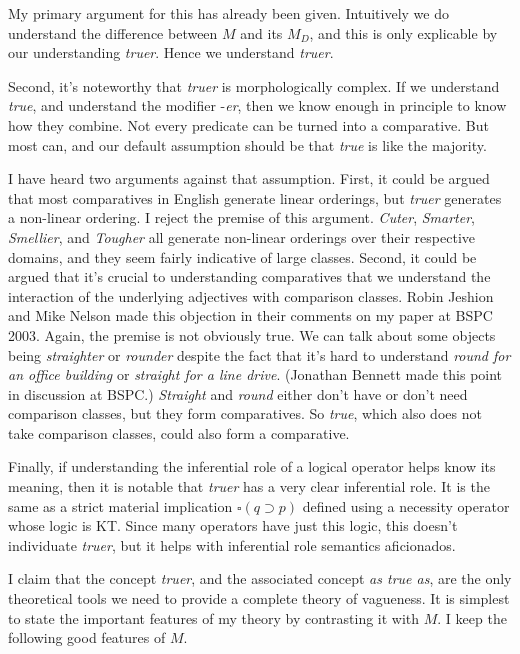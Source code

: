 My primary argument for this has already been given. Intuitively we do understand the difference between \(M\) and its \(M_D\), and this is only explicable by our understanding \textit{truer}. Hence we understand \textit{truer}.

Second, it's noteworthy that \textit{truer} is morphologically complex. If we understand \textit{true}, and understand the modifier -\textit{er}, then we know enough in principle to know how they combine. Not every predicate can be turned into a comparative. But most can, and our default assumption should be that \textit{true} is like the majority.

I have heard two arguments against that assumption. First, it could be argued that most comparatives in English generate linear orderings, but \textit{truer} generates a non-linear ordering. I reject the premise of this argument. \textit{Cuter}, \textit{Smarter}, \textit{Smellier}, and \textit{Tougher} all generate non-linear orderings over their respective domains, and they seem fairly indicative of large classes. Second, it could be argued that it's crucial to understanding comparatives that we understand the interaction of the underlying adjectives with comparison classes. Robin Jeshion and Mike Nelson made this objection in their comments on my paper at BSPC 2003. Again, the premise is not obviously true. We can talk about some objects being \textit{straighter} or \textit{rounder} despite the fact that it's hard to understand \textit{round for an office building} or \textit{straight for a line drive}. (Jonathan Bennett made this point in discussion at BSPC.) \textit{Straight} and \textit{round} either don't have or don't need comparison classes, but they form comparatives. So \textit{true}, which also does not take comparison classes, could also form a comparative.

Finally, if understanding the inferential role of a logical operator helps know its meaning, then it is notable that \textit{truer} has a very clear inferential role. It is the same as a strict material implication \(\square (q \supset p)\) defined using a necessity operator whose logic is KT. Since many operators have just this logic, this doesn't individuate \textit{truer}, but it helps with inferential role semantics aficionados.

I claim that the concept \textit{truer}, and the associated concept \textit{as true as}, are the only theoretical tools we need to provide a complete theory of vagueness. It is simplest to state the important features of my theory by contrasting it with \(M\). I keep the following good features of \(M\).

